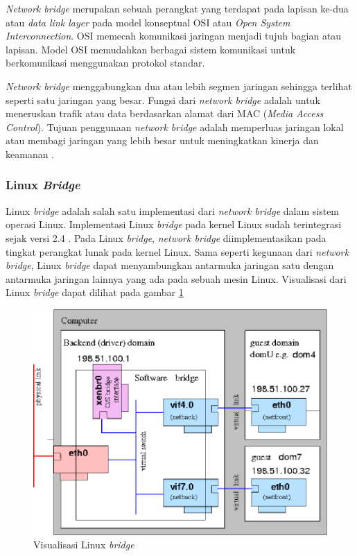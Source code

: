 \emph{Network bridge} merupakan sebuah perangkat yang terdapat pada lapisan ke-dua atau \emph{data link layer} pada
model konseptual OSI atau \emph{Open System Interconnection}. OSI memecah komunikasi jaringan
menjadi tujuh bagian atau lapisan. Model OSI memudahkan berbagai sistem komunikasi
untuk berkomunikasi menggunakan protokol standar.

\emph{Network bridge} menggabungkan dua atau lebih segmen jaringan sehingga terlihat
seperti satu jaringan yang besar. Fungsi dari \emph{network bridge} adalah untuk meneruskan
trafik atau data berdasarkan alamat dari MAC (\emph{Media Access Control}). Tujuan
penggunaan \emph{network bridge} adalah memperluas jaringan lokal atau
membagi jaringan yang lebih besar untuk meningkatkan kinerja dan keamanan \parencite{network-bridge}.

\subsubsection{Linux \emph{Bridge}}

Linux \emph{bridge} adalah salah satu implementasi dari \emph{network bridge} dalam sistem
operasi Linux. Implementasi Linux \emph{bridge} pada kernel Linux sudah
terintegrasi sejak versi 2.4 \parencite{linux-foundation-bridge-website}.
Pada Linux \emph{bridge}, \emph{network bridge} diimplementasikan pada tingkat
perangkat lunak pada kernel Linux. Sama seperti kegunaan dari \emph{network bridge},
Linux \emph{bridge} dapat menyambungkan antarmuka jaringan satu dengan antarmuka jaringan
lainnya yang ada pada sebuah mesin Linux. Visualisasi dari Linux \emph{bridge}
dapat dilihat pada gambar \ref{fig:linux-bridge}

\begin{figure}[H]
  \centering

  \includegraphics[scale=0.3]{gambar/linux-bridge.png}

  \caption{Visualisasi Linux \emph{bridge}}
  \label{fig:linux-bridge}
\end{figure}

